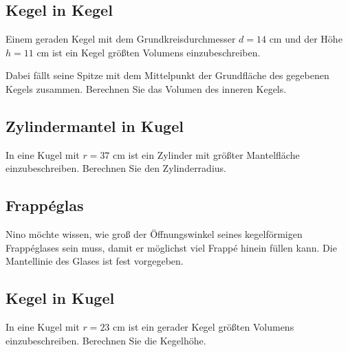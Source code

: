 \subsection{Kegel in Kegel}
Einem geraden Kegel mit dem Grundkreisdurchmesser $d = 14 \text{ cm}$ und der
Höhe $h = 11 \text{ cm}$
ist ein Kegel größten Volumens einzubeschreiben.

Dabei fällt seine Spitze mit dem Mittelpunkt der Grundfläche des
gegebenen Kegels zusammen.
Berechnen Sie das Volumen des inneren Kegels.





\subsection{Zylindermantel in Kugel}
In eine Kugel mit $r = 37 \text{ cm}$ ist ein Zylinder mit größter
Mantelfläche einzubeschreiben.
Berechnen Sie den Zylinderradius.


\subsection{Frappéglas}

Nino möchte wissen, wie groß der Öffnungswinkel seines kegelförmigen
Frappéglases sein muss, damit er möglichst viel Frappé hinein füllen
kann. Die Mantellinie des Glases ist fest vorgegeben.



\subsection{Kegel in Kugel}
In eine Kugel mit $r = 23 \text{ cm}$ ist ein gerader Kegel größten Volumens einzubeschreiben. Berechnen Sie die Kegelhöhe.



